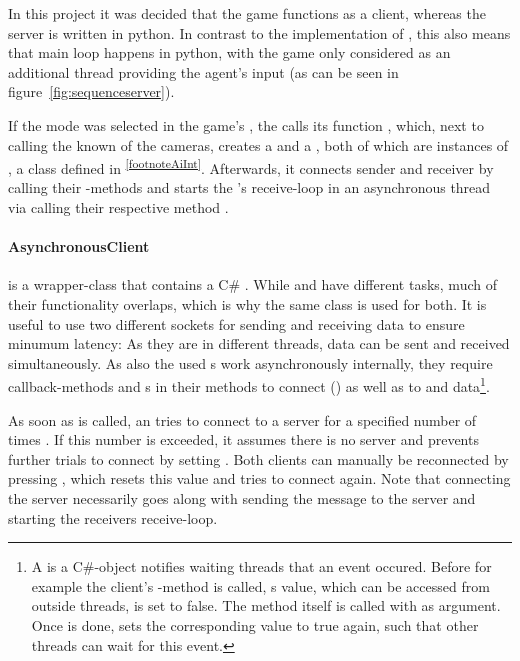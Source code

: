 In this project it was decided that the game functions as a client, whereas the server is written in python. In contrast to the implementation of \cite{loiacono_simulated_2013}, this also means that main loop happens in python, with the game only considered as an additional thread providing the agent's input (as can be seen in figure~\ref{fig:sequenceserver}).  

If the  mode was selected in the game's , the  calls 
its function , which, next to calling the known  of the cameras, creates a  and a , both of which are instances of , a class defined in \textsuperscript{\ref{footnoteAiInt}}. Afterwards, it connects sender and receiver by calling their -methods and starts the 's receive-loop in an asynchronous thread via calling their respective method . 

\paragraph{AsynchronousClient} is a wrapper-class that contains a C\# . While  and  have different tasks, much of their functionality overlaps, which is why the same class is used for both. It is useful to use two different sockets for sending and receiving data to ensure minumum latency: As they are in different threads, data can be sent and received simultaneously. As also the used s work asynchronously internally, they require callback-methods and s in their methods to connect () as well as to  and  data\footnote{A  is a C\#-object notifies waiting threads that an event occured. Before for example the client's -method is called, s value, which can be accessed from outside threads, is set to false. The method itself is called with  as argument. Once  is done,  sets the corresponding value to true again, such that other threads can wait for this event.}.

As soon as  is called, an  tries to connect to a server for a specified number of times . If this number is exceeded, it assumes there is no server and prevents further trials to connect by setting . Both clients can manually be reconnected by pressing , which resets this value and tries to connect again. Note that connecting the server necessarily goes along with sending the message  to the server and starting the receivers receive-loop. 

